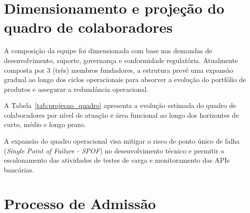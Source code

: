 \documentclass[
  12pt,
  openright,
  oneside,
  a4paper,
  brazilian
]{abntex2}
\begin{document}
\section{Dimensionamento e projeção do quadro de colaboradores}
\label{sec:dimensionamento_quadro}

A composição da equipe foi dimensionada com base nas demandas de desenvolvimento, suporte, governança e conformidade regulatória. Atualmente composta por 3 (três) membros fundadores, a estrutura prevê uma expansão gradual ao longo dos ciclos operacionais para absorver a evolução do portfólio de produtos e assegurar a redundância operacional.

A Tabela~\ref{tab:projecao_quadro} apresenta a evolução estimada do quadro de colaboradores por nível de atuação e área funcional ao longo dos horizontes de curto, médio e longo prazo.

\begin{table}[htbp]
\centering
\caption{Projeção de evolução do quadro de colaboradores da Jataí.}
\label{tab:projecao_quadro}
\end{table}

A expansão do quadro operacional visa mitigar o risco de ponto único de falha (\textit{Single Point of Failure - SPOF}) no desenvolvimento técnico e permitir o escalonamento das atividades de testes de carga e monitoramento das APIs bancárias.

\section{Processo de Admissão}
\label{sec:processo_selecao}
\end{document}
